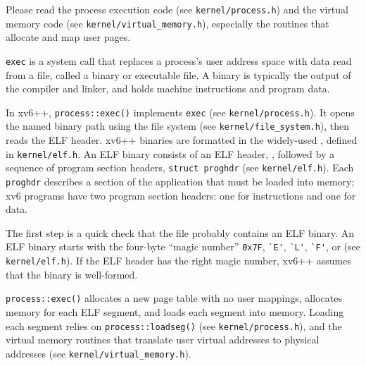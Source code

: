 Please read the process execution code (see \texttt{kernel/process.h}) and
the virtual memory code (see \texttt{kernel/virtual\_memory.h}),
especially the routines that allocate and map user pages.

\lstinline{exec} is a system call that replaces a process's user address
space with data read from a file, called a binary or executable file. A
binary is typically the output of the compiler and linker, and holds
machine instructions and program data.

In xv6++, \lstinline{process::exec()} implements \lstinline{exec} (see
\texttt{kernel/process.h}). It opens the named binary path using the
file system (see \texttt{kernel/file\_system.h}), then reads the ELF header.
xv6++ binaries are formatted in the widely-used ,
defined in \texttt{kernel/elf.h}. An ELF binary consists of an ELF header,
, followed by a sequence of program section headers,
\lstinline{struct proghdr} (see \texttt{kernel/elf.h}). Each \lstinline{proghdr}
describes a section of the application that must be loaded into memory; xv6
programs have two program section headers: one for instructions and one for data.

The first step is a quick check that the file probably contains an ELF
binary. An ELF binary starts with the four-byte ``magic number''
\lstinline{0x7F}, \lstinline{`E'}, \lstinline{`L'}, \lstinline{`F'},
or  (see \texttt{kernel/elf.h}). If the ELF header has
the right magic number, xv6++ assumes that the binary is well-formed.

\lstinline{process::exec()} allocates a new page table with no user mappings,
allocates memory for each ELF segment, and loads each segment into memory.
Loading each segment relies on \lstinline{process::loadseg()} (see
\texttt{kernel/process.h}), and the virtual memory routines that translate
user virtual addresses to physical addresses (see \texttt{kernel/virtual\_memory.h}).

